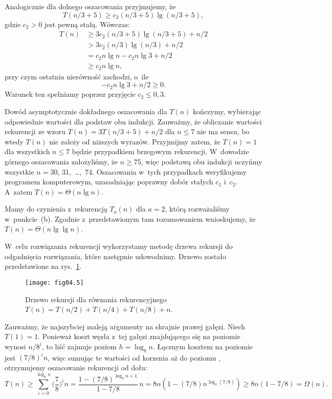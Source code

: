 Analogicznie dla dolnego oszacowania przyjmujemy, że
\[
	T(n/3+5) \ge c_2(n/3+5)\lg(n/3+5),
\]
gdzie $c_2>0$ jest pewną stałą. Wówczas:
\begin{align*}
	T(n) &\ge 3c_2(n/3+5)\lg(n/3+5)+n/2 \\
	&> 3c_2(n/3)\lg(n/3)+n/2 \\
	&= c_2n\lg n-c_2n\lg3+n/2 \\
	&\ge c_2n\lg n,
\end{align*}
przy czym ostatnia nierówność zachodzi, o~ile
\[
	-c_2n\lg3+n/2 \ge 0.
\]
Warunek ten spełniamy poprzez przyjęcie $c_2\le0{,}3$.

Dowód asymptotycznie dokładnego oszacowania dla $T(n)$ kończymy, wybierając odpowiednie wartości dla podstaw obu indukcji. Zauważmy, że obliczanie wartości rekurencji ze wzoru $T(n)=3T(n/3+5)+n/2$ dla $n\le7$ nie ma sensu, bo wtedy $T(n)$ nie zależy od niższych wyrazów. Przyjmijmy zatem, że $T(n)=1$ dla wszystkich $n\le7$ będzie przypadkiem brzegowym rekurencji. W~dowodzie górnego oszacowania założyliśmy, że $n\ge75$, więc podstawą obu indukcji uczyńmy wszystkie $n=30$, 31,~\dots,~74. Oszacowania w~tych przypadkach weryfikujemy programem komputerowym, uzasadniając poprawny dobór stałych $c_1$ i~$c_2$. A~zatem $T(n)=\Theta(n\lg n)$.

\subproblem %
Mamy do czynienia z~rekurencją $T_a(n)$ dla $a=2$, którą rozważaliśmy w~punkcie~(b). Zgodnie z~przedstawionym tam rozumowaniem wnioskujemy, że $T(n)=\Theta(n\lg\lg n)$.

\subproblem %
W~celu rozwiązania rekurencji wykorzystamy metodę drzewa rekursji do odgadnięcia rozwiązania, które następnie udowodnimy. Drzewo zostało przedstawione na rys.~\ref{fig:4-4f}.
\begin{figure}[ht]
	\begin{center}
		\texttt{[image: fig04.5]}
	\end{center}
	\caption{Drzewo rekursji dla równania rekurencyjnego $T(n)=T(n/2)+T(n/4)+T(n/8)+n$.} \label{fig:4-4f}
\end{figure}

Zauważmy, że najszybciej maleją argumenty na skrajnie prawej gałęzi. Niech $T(1)=1$. Ponieważ koszt węzła z~tej gałęzi znajdującego się na  poziomie wynosi $n/8^i$, to liść zajmuje poziom $h=\log_8n$. Łącznym kosztem na  poziomie jest $(7/8)^in$, więc sumując te wartości od korzenia aż do poziomu , otrzymujemy oszacowanie rekurencji od dołu:
\[
	T(n) \ge \sum_{i=0}^{\log_8n}\biggl(\frac{7}{8}\biggr)^in = \frac{1-(7/8)^{\log_8n+1}}{1-7/8}\,n = 8n(1-(7/8)n^{\log_8(7/8)}) \ge 8n(1-7/8) = \Omega(n).
\]

